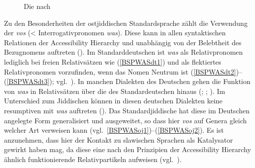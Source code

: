 \begin{figure}
 \caption{Die  nach \citealt[66]{KeenanComrie1977}}\label{accessibilityscale} 
  \end{figure}
 

  
  Zu den Besonderheiten der ostjiddischen Standardsprache zählt die Verwendung der   \textit{vos} (<  Interrogativpronomen \textit{was}). Diese kann in allen syntaktischen Relationen der Accessibility Hierarchy und unabhängig von der Belebtheit des Bezugnomens auftreten (\citealt{Fleischer2004d,Fleischer2005b,Fleischer2004c,Fleischer2007,Fleischer2010,Fleischer2014b}). Im Standarddeutschen ist \textit{was} als Relativpronomen lediglich bei freien Relativsätzen wie (\ref{BSPWASdt1}) und als flektiertes Relativpronomen vorzufinden, 
wenn 
das Nomen Neutrum ist (\ref{BSPWASdt2})–(\ref{BSPWASdt3}); vgl.\, %
  \citealt[267–269]{Eisenberg2004}). 
  In manchen Dialekten des Deutschen gehen die Funktion von \textit{was} in Relativsätzen über die des Standardeutschen hinaus (\citealt[65]{Weise1917}; \citealt[223]{Fleischer2004c}; \citeyear[71f]{Fleischer2004d}). Im Unterschied zum Jiddischen können in diesen deutschen Dialekten keine resumptiven  mit \textit{was} auftreten (\citealt[164]{Fleischer2010}). Das Standardjiddische hat diese im Deutschen angelegte Form generalisiert und ausgeweitet, so dass hier  \textit{vos} auf Genera gleich welcher Art verweisen kann (vgl.\, \ref{BSPWASoj1})–(\ref{BSPWASoj2}). Es ist anzunehmen, dass hier der Kontakt zu slawischen Sprachen als Katalysator gewirkt haben mag, da diese eine nach den Prinzipien der Accessibility Hierarchy ähnlich funktionierende Relativpartikeln aufweisen (vgl.\, \citealt[41f]{Fleischer2007}). 
  
